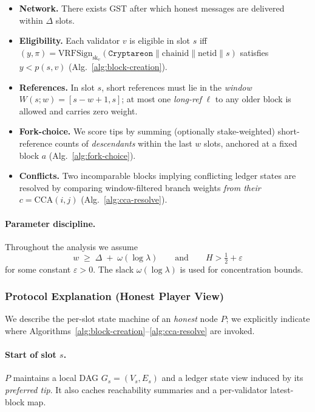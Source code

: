 \documentclass[11pt]{article}
\newcommand{\sk}{\ensuremath{\mathrm{sk}}\xspace}
\newcommand{\VRFSign}{\ensuremath{\mathrm{VRFSign}}\xspace}
\newcommand{\domsep}{\ensuremath{\mathtt{Cryptareon}}\xspace}
\newcommand{\chainid}{\ensuremath{\mathrm{chainid}}\xspace}
\newcommand{\netid}{\ensuremath{\mathrm{netid}}\xspace}
\newcommand{\CCA}{\ensuremath{\mathrm{CCA}}\xspace}
\begin{document}
\begin{itemize}
  \item \textbf{Network.} There exists GST after which honest messages are delivered within $\Delta$ slots.
  \item \textbf{Eligibility.} Each validator $v$ is eligible in slot $s$ iff $(y,\pi)=\VRFSign_{\sk_v}(\domsep\|\chainid\|\netid\|s)$ satisfies $y<p(s,v)$ (Alg.~\ref{alg:block-creation}).
  \item \textbf{References.} In slot $s$, short references must lie in the \emph{window} $W(s;w)=[s{-}w{+}1,s]$; at most one \emph{long-ref} $\ell$ to any older block is allowed and carries zero weight.
  \item \textbf{Fork-choice.} We score tips by summing (optionally stake-weighted) short-reference counts of \emph{descendants} within the last $w$ slots, anchored at a fixed block $a$ (Alg.~\ref{alg:fork-choice}).
  \item \textbf{Conflicts.} Two incomparable blocks implying conflicting ledger states are resolved by comparing window-filtered branch weights \emph{from their} $c=\CCA(i,j)$ (Alg.~\ref{alg:cca-resolve}).
\end{itemize}

\paragraph{Parameter discipline.} Throughout the analysis we assume
\begin{equation}
\label{eq:base-params}
w \;\ge\; \Delta \;+\; \omega(\log\lambda) \qquad\text{and}\qquad 
H>\tfrac{1}{2}+\varepsilon
\end{equation}
for some constant $\varepsilon>0$. The slack $\omega(\log\lambda)$ is used for concentration bounds.

\subsubsection{Protocol Explanation (Honest Player View)}
\label{subsec:base-walkthrough}
We describe the per-slot state machine of an \emph{honest} node $P$; we explicitly indicate where Algorithms~\ref{alg:block-creation}–\ref{alg:cca-resolve} are invoked. 


\paragraph{Start of slot $s$.}
$P$ maintains a local DAG $G_s=(V_s,E_s)$ and a ledger state view induced by its \emph{preferred tip}. It also caches reachability summaries and a per-validator latest-block map.
\end{document}
